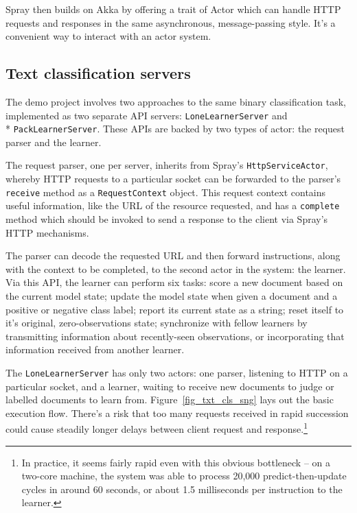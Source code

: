\documentclass[tablecaption=bottom,wcp]{jmlr}
\begin{document}
Spray then builds on Akka by offering a trait of Actor which can handle HTTP 
requests and responses in the same asynchronous, message-passing style.
It's a convenient way to interact with an actor system.

\subsection{Text classification servers}

The demo project involves two approaches to the same binary classification task,
implemented as two separate API servers: \texttt{LoneLearnerServer} and
\\* \texttt{PackLearnerServer}. These APIs are backed by two types of actor: the request
parser and the learner. 

The request parser, one per server, inherits from Spray's \texttt{HttpServiceActor},
whereby HTTP requests to a particular socket can be forwarded to the parser's
\texttt{receive} method as a \texttt{RequestContext} object. This request context
contains useful information, like the URL of the resource requested, and has a
\texttt{complete} method which should be invoked to send a response to the
client via Spray's HTTP mechanisms.

The parser can decode the requested URL and then forward instructions, along with
the context to be completed, to the second actor in the system: the learner. Via this 
API, the learner can perform six tasks: score a new document based on the current 
model state; update the model state when given a document and a positive or negative 
class label; report its current state as a string; reset itself to it's original, 
zero-observations state; synchronize with fellow learners by transmitting information
about recently-seen observations, or incorporating that information received from another
learner.

The \texttt{LoneLearnerServer} has only two actors: one parser, listening to HTTP on
a particular socket, and a learner, waiting to receive new documents to judge or labelled
documents to learn from. Figure~\ref{fig_txt_cls_sng} lays out the basic execution flow.
There's a risk that too many requests received in rapid succession could cause steadily
longer delays between client request and response.\footnote{In practice, it seems
fairly rapid even with this obvious bottleneck -- on a two-core machine, the system was
able to process 20,000 predict-then-update cycles in around 60 seconds, or about 
1.5 milliseconds per instruction to the learner.}
\end{document}
